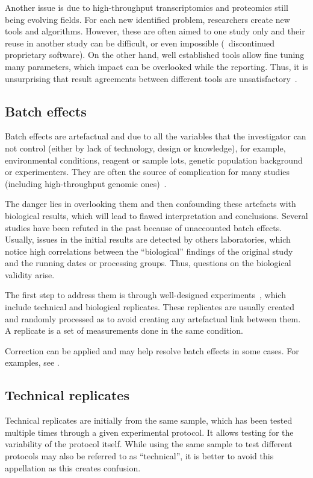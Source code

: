 Another issue is due to high-throughput transcriptomics and proteomics
still being evolving fields.
For each new identified problem,
researchers create new tools and algorithms.
However, these are often aimed to one study only
and their reuse in another study can be difficult,
or even impossible (\eg\ discontinued proprietary software).
On the other hand, well established tools allow fine tuning many parameters,
which impact can be overlooked while the reporting.
Thus, it is unsurprising that result agreements between different tools
are unsatisfactory~.\mybr\

\subsection{Batch effects}\label{sub:BatchEffect}

Batch effects are artefactual and due to all the variables
that the investigator can not control
(either by lack of technology, design or knowledge), for example,
environmental conditions, reagent or sample lots,
genetic population background or experimenters.
They are often the source of complication for many studies
(including high-throughput genomic ones)~.\mybr\

The danger lies in overlooking them and then confounding these artefacts
with biological results, which will lead to flawed interpretation and conclusions.
Several studies have been refuted in the past because of unaccounted batch effects.
Usually, issues in the initial results are detected by others laboratories,
which notice high correlations between the \enquote{biological} findings
of the original study and the running dates or processing groups.
Thus, questions on the biological validity arise.\mybr\

The first step to address them is through well-designed experiments~,
which include technical and biological replicates.
These replicates are usually created and randomly processed
as to avoid creating any artefactual link between them.
A replicate is a set of measurements done in the same condition.\mybr\

Correction can be applied and may help resolve batch effects in some cases.
For examples, see \citet{Oytam2016-rb,Gagnon-Bartsch2012-dj,Peixoto2015-wg}.\mybr\

\subsection{Technical replicates}
Technical replicates are initially from the same sample,
which has been tested multiple times through a given experimental protocol.
It allows testing for the variability of the protocol itself.
While using the same sample to test different protocols
may also be referred to as \enquote{technical},
it is better to avoid this appellation as this creates confusion.\mybr\

